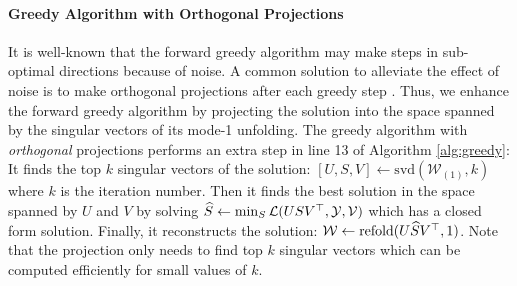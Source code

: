 \paragraph{Greedy Algorithm with Orthogonal Projections} It is well-known that the forward greedy algorithm may make steps in sub-optimal directions because of noise.  A common solution to alleviate the effect of noise is to make orthogonal projections after each greedy step \cite{Barron2008,Shwartz11}. Thus, we enhance the forward greedy algorithm by projecting the solution into the space spanned by the singular vectors of its mode-1 unfolding. The  greedy algorithm with \textit{orthogonal} projections performs an extra step in line 13 of Algorithm \ref{alg:greedy}:  It finds the top $k$ singular vectors of the solution: $[U, S, V] \gets \mathrm{svd}(\mathcal{W}_{(1)}, k)$ where $k$ is the iteration number. Then it finds the best solution in the space spanned by $U$ and $V$ by solving $\widehat{S} \gets \min_{S}\mathcal{L}(USV^{\top}, {\mathcal Y}, {\mathcal V})$ which has a closed form solution. Finally, it reconstructs the solution: ${\mathcal W} \gets \mathrm{refold}(U\widehat{S}V^{\top}, 1)$. Note that the projection only needs to find top $k$ singular vectors which can be computed efficiently for small values of $k$.




